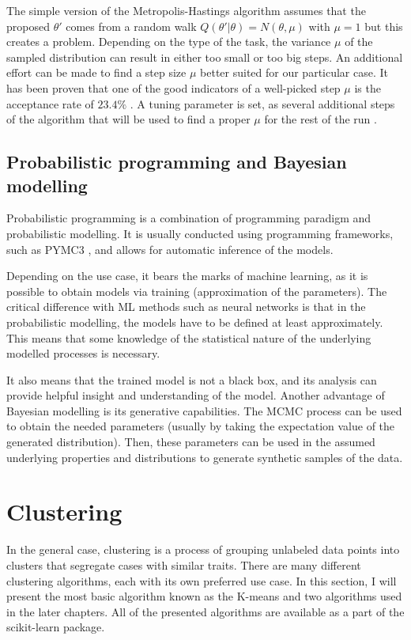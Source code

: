 The simple version of the Metropolis-Hastings algorithm assumes that the proposed $\theta\prime$ comes from a random walk $Q(\theta'|\theta)=N(\theta, \mu)$ with $\mu=1$ but this creates a problem.
Depending on the type of the task, the variance $\mu$ of the sampled distribution can result in either too small or too big steps.
An additional effort can be made to find a step size $\mu$ better suited for our particular case.
It has been proven that one of the good indicators of a well-picked step $\mu$ is the acceptance rate of $23.4\%$ \cite{10.1214/aoap/1034625254}.
A tuning parameter is set, as several additional steps of the algorithm that will be used to find a proper $\mu$ for the rest of the run \cite{colin_carroll_2019}.

\subsection{Probabilistic programming and Bayesian modelling}

Probabilistic programming is a combination of programming paradigm and probabilistic modelling.
It is usually conducted using programming frameworks, such as PYMC3 \cite{Salvatier2016}, and allows for automatic inference of the models.

Depending on the use case, it bears the marks of machine learning, as it is possible to obtain models via training (approximation of the parameters).
The critical difference with ML methods such as neural networks is that in the probabilistic modelling, the models have to be defined at least approximately.
This means that some knowledge of the statistical nature of the underlying modelled processes is necessary.

It also means that the trained model is not a black box, and its analysis can provide helpful insight and understanding of the model.
Another advantage of Bayesian modelling is its generative capabilities.
The MCMC process can be used to obtain the needed parameters (usually by taking the expectation value of the generated distribution).
Then, these parameters can be used in the assumed underlying properties and distributions to generate synthetic samples of the data.

\section{Clustering}
\label{sec:clustering}

In the general case, clustering is a process of grouping unlabeled data points into clusters that segregate cases with similar traits. There are many different clustering algorithms, each with its own preferred use case. In this section, I will present the most basic algorithm known as the K-means and two algorithms used in the later chapters. All of the presented algorithms are available as a part of the scikit-learn \cite{scikit-learn} package.

